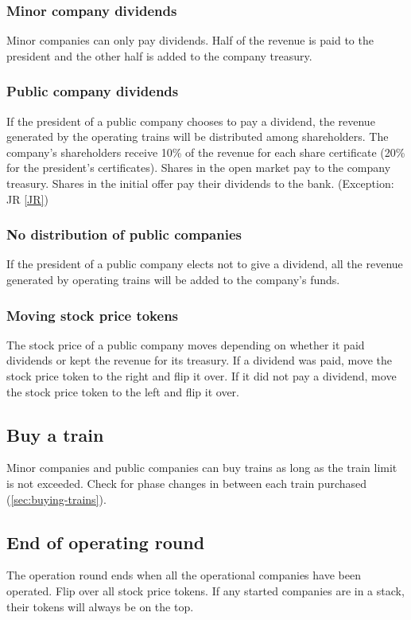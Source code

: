 \documentclass{article}
\begin{document}
\begin{CJK}{UTF8}{min}
\begin{multicols}{2}
\subsubsection{Minor company dividends} \label{or-minor-dividends}
Minor companies can only pay dividends. Half of the revenue is paid to
the president and the other half is added to the company treasury.

\subsubsection{Public company dividends} \label{or-public-dividends}
If the president of a public company chooses to pay a dividend, the
revenue generated by the operating trains will be distributed among
shareholders. The company's shareholders receive 10\% of the revenue
for each share certificate (20\% for the president's
certificates). Shares in the open market pay to the company
treasury. Shares in the initial offer pay their dividends to the
bank. (Exception: JR \autoref{JR})

\subsubsection{No distribution of public companies} \label{or-withholding}
If the president of a public company elects not to give a dividend,
all the revenue generated by operating trains will be added to the
company's funds.

\subsubsection{Moving stock price tokens} \label{or-moving-stock-prices}
The stock price of a public company moves depending on whether it paid
dividends or kept the revenue for its treasury. If a dividend was
paid, move the stock price token to the right and flip it over. If it
did not pay a dividend, move the stock price token to the left and
flip it over.

\subsection{Buy a train}
Minor companies and public companies can buy trains as long as
the train limit is not exceeded. Check for phase changes in between
each train purchased (\autoref{sec:buying-trains}).

\subsection{End of operating round}
The operation round ends when all the operational companies have been
operated. Flip over all stock price tokens. If any started companies
are in a stack, their tokens will always be on the top.


\end{multicols}
\end{CJK}
\end{document}
